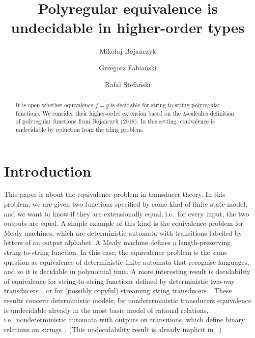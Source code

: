 \documentclass{article}
\begin{document}
\title{Polyregular equivalence is undecidable in higher-order types}
\author[1]{Miko{\l}aj Boja\'nczyk}
\author[2]{Grzegorz Fabia\'nski}
\author[2]{Rafa{\l} Stefa\'nski}

\maketitle 
\begin{abstract}
  It is open whether equivalence $f = g$ is decidable for string-to-string polyregular functions. We consider their higher-order extension based on the $\lambda$-calculus definition of polyregular functions from Bojańczyk (2018). In this setting, equivalence is undecidable by reduction from the tiling problem.
\end{abstract}

\section{Introduction}
\label{sec:introduction}
This paper is about the equivalence problem in transducer theory. In this problem, we are given two functions specified by some kind of finite state model, and we want to know if they are extensionally equal, i.e.~for every input, the two outputs are equal. A simple example of this kind is the equivalence problem for Mealy machines, which are deterministic automata with transitions labelled by letters of an output alphabet. A Mealy machine defines a length-preserving string-to-string function. In this case, the equivalence problem is the same question as equivalence of deterministic finite automata that recognise languages, and so it is decidable in polynomial time. A more interesting result is decidability of equivalence for string-to-string functions defined by deterministic two-way transducers~\cite[Theorem 1]{gurariEquivalenceProblemDeterministic1982}, or for (possibly copyful) streaming string transducers~\cite[Theorem 3]{filiotCopyfulStreamingString2017}. These results concern deterministic models; for nondeterministic transducers equivalence is undecidable already in the most basic model of rational relations, i.e.~nondeterministic automata with outputs on transitions, which define binary relations on strings~\cite[Corollary 4.1]{sakarovitch2009elements}. (This undecidability result is already implicit in~\cite[Theorem 18]{RabinScott59}.)
\end{document}
